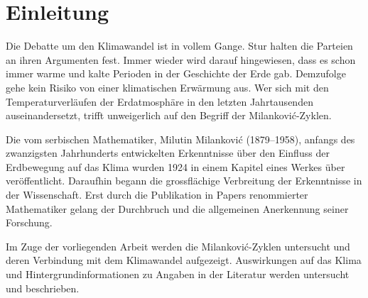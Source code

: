 %
%
%
%
\section{Einleitung\label{milankovic:section:Einleitung}}

Die Debatte um den Klimawandel ist in vollem Gange.
%
Stur halten die Parteien an ihren Argumenten fest.
Immer wieder wird darauf hingewiesen, dass es schon immer warme und kalte Perioden in der Geschichte der Erde gab.
Demzufolge gehe kein Risiko von einer klimatischen Erwärmung aus.
Wer sich mit den Temperaturverläufen der Erdatmosphäre in den letzten Jahrtausenden auseinandersetzt, trifft unweigerlich auf den Begriff der Milankovi\'c-Zyklen.
%

Die vom serbischen Mathematiker, Milutin Milankovi\'c (1879--1958), anfangs des zwanzigsten Jahrhunderts entwickelten Erkenntnisse über den Einfluss der Erdbewegung auf das Klima wurden 1924 in einem Kapitel eines Werkes über
\cite{milankovic:Klimate-der-geologischen-Vorzeit}
veröffentlicht.
Daraufhin begann die grossflächige Verbreitung der Erkenntnisse in der Wissenschaft.
Erst durch die Publikation in Papers renommierter Mathematiker gelang der Durchbruch und die allgemeinen Anerkennung seiner Forschung.

Im Zuge der vorliegenden Arbeit werden die Milankovi\'c-Zyklen untersucht und deren Verbindung mit dem Klimawandel aufgezeigt. Auswirkungen auf das Klima und Hintergrundinformationen zu Angaben in der Literatur werden untersucht und beschrieben.
%


